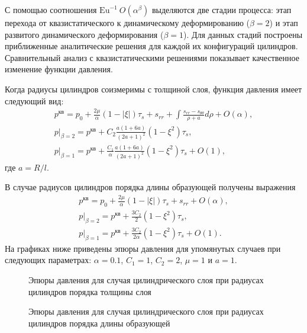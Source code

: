 С помощью соотношения $\text{Eu}^{-1}~O(\alpha^\beta)$ выделяются две стадии процесса: этап перехода от квазистатического к динамическому деформированию ($\beta=2$) и этап развитого динамического деформирования ($\beta=1$). Для данных стадий построены приближенные аналитические решения для каждой их конфигураций цилиндров. Сравнительный анализ с квазистатическими решениями показывает качественное изменение функции давления.

Когда радиусы цилиндров соизмеримы с толщиной слоя, функция давления имеет следующий вид:
\begin{gather}
  p^\text{кв} = p_0 + \frac{2\mu}{\alpha}\left(1-\lvert\xi\rvert\right) \tau_{s} + s_{rr} + \int\frac{s_{rr}-s_{\theta\theta}}{\rho+a}d\rho + O(\alpha),
  \\
  p\lvert_{\beta=2} = p^\text{кв} + C_2 \frac{a(1+6a)}{(2a+1)^2}\left(1-\xi^2\right) \tau_{s},
  \\
  p\lvert_{\beta=1} = p^\text{кв}+ \frac{C_1}{\alpha} \frac{a(1+6a)}{(2a+1)^2}\left(1-\xi^2\right)\tau_{s} + O(1),
\end{gather}
где $a=R/l$.

В случае радиусов цилиндров порядка длины образующей получены выражения
\begin{gather}
  p^\text{кв} = p_0 + \frac{2\mu}{\alpha}\left(1-\lvert\xi\rvert\right)\tau_{s} + s_{rr} + O(\alpha),
  \\
  p\lvert_{\beta=2} = p^\text{кв} + \frac{3 C_2}{2}\left(1-\xi^2\right) \tau_{s},
  \\
  p\lvert_{\beta=1} = p^\text{кв}+ \frac{3 C_2}{2 \alpha}\left(1-\xi^2\right)\tau_{s} + O(1).
\end{gather}
На графиках ниже приведены эпюры давления для упомянутых случаев при следующих параметрах: $\alpha=0.1$, $C_1=1$, $C_2=2$, $\mu=1$ и $a=1$.
\begin{figure}[ht]
  \caption{Эпюры давления для случая цилиндрического слоя при радиусах цилиндров порядка толщины слоя}
  \label{fig:ch2/sub1/pressure}
\end{figure}
\begin{figure}[ht]
  \caption{Эпюры давления для случая цилиндрического слоя при радиусах цилиндров порядка длины образующей}
  \label{fig:ch2/sub2/pressure}
\end{figure}

